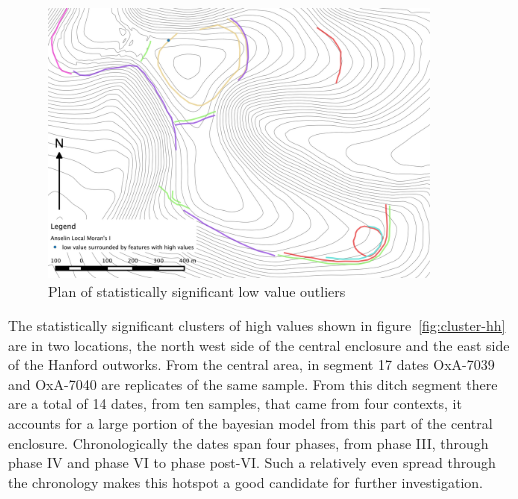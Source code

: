 \begin{figure} 
\centering
	\includegraphics[width=0.9\textwidth]{figures/cluster-LH}
  \caption{Plan of statistically significant low value outliers}
  \label{fig:cluster-lh}
\end{figure}

The statistically significant clusters of high values shown in figure~\ref{fig:cluster-hh} are in two locations, the north west side of the central enclosure and the east side of the Hanford outworks. From the central area, in segment 17 dates OxA-7039 and OxA-7040 are replicates of the same sample. From this ditch segment there are a total of 14 dates, from ten samples, that came from four contexts, it accounts for a large portion of the bayesian model from this part of the central enclosure. Chronologically the dates span four phases, from phase III, through phase IV and phase VI to phase post-VI. Such a relatively even spread through the chronology makes this hotspot a good candidate for further investigation.

